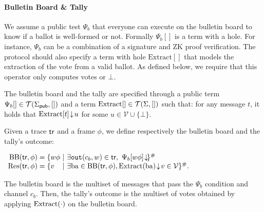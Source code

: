 \paragraph{\textbf{Bulletin Board \& Tally}}
We assume a public test $\Psi_b$ that everyone can execute on
the bulletin board to know if a ballot is well-formed or not.
Formally $\Psi_b[]$ is a term with a hole.
For instance, $\Psi_b$ can be a combination of a signature and ZK proof verification.
The protocol should also specify a term with hole
$\mathrm{Extract}[]$ that models the extraction of the vote from a
valid ballot.
As defined below, we require that this operator only computes votes or
$\bot$.
\begin{definition}
\label{def:bb}
The bulletin board and the tally are specified through
a public term $\Psi_b[]\in\mathcal{T}(\Sigma_{\mathsf{pub}},[])$ and
a term $\mathrm{Extract}[]\in\mathcal{T}(\Sigma,[])$ such that:
for any message $t$, it holds that
$\mathrm{Extract}[t]\!\downarrow\! u$ for some $u\in\mathcal{V}\cup\{\bot\}$.

Given a trace $\mathsf{tr}$ and a frame $\phi$, we define respectively the bulletin board and
the tally's outcome:\\[0.5mm]
\begin{small}
  \null\hfill$
  \begin{array}[]{r@{$\;$}l@{$\;$}l@{}r@{}l}
    \BB(\tr,\phi)&=& \{w\phi\ & |\ & \exists\Out(c_b,w)\in\tr,\ \Psi_b[w\phi]\redc\}^\#\\
    \Res(\tr,\phi)&=& \{v\ & |\ & \exists \mathrm{ba}\in\BB(\tr,\phi), \Extract(\mathrm{ba})\redc v\in\mathcal{V}\}^\#.
  \end{array}
  $\hfill\null
\end{small}
\end{definition}

The bulletin board is the {multiset} of messages %
that pass the $\Psi_b$ condition and
channel $c_b$.
Then, the tally's outcome is the {multiset} of votes obtained by applying
$\mathrm{Extract}(\cdot)$ on the %
bulletin board.


